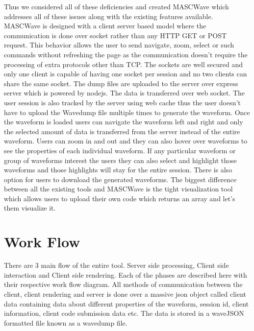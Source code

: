\documentclass[14pt]{extarticle}
\begin{document}
\par Thus we considered all of these deficiencies and created MASCWave which addresses all of these issues along with the existing features available. MASCWave is designed with a client server based model where the communication is done over socket rather than any HTTP GET or POST request. This behavior allows the user to send navigate, zoom, select or such commands without refreshing the page as the communication doesn't require the processing of extra protocols other than TCP. The sockets are well secured and only one client is capable of having one socket per session and no two clients can share the same socket. The dump files are uploaded to the server over express server which is powered by nodejs. The data is transferred over web socket. The user session is also tracked by the server using web cache thus the user doesn't have to upload the Wavedump file multiple times to generate the waveform. Once the waveform is loaded users can navigate the waveform left and right and only the selected amount of data is transferred from the server instead of the entire waveform. Users can zoom in and out and they can also hover over waveforms to see the properties of each individual waveform. If any particular waveform or group of waveforms interest the users they can also select and highlight those waveforms and those  highlights will stay for the entire session. There is also option for users to download the generated waveforms. The biggest difference between all the existing tools and MASCWave is the tight visualization tool which allows users to upload their own code which returns an array and let's them visualize it. 

\section{Work Flow}
\par There are 3 main flow of the entire tool. Server side processing, Client side interaction and Client side rendering. Each of the phases are described here with their respective work flow diagram. All methods of communication between the client, client rendering and server is done over a massive json object called client data containing data about different properties of the waveform, session id, client information, client code submission data etc. The data is stored in a waveJSON formatted file known as a wavedump file.
\end{document}
